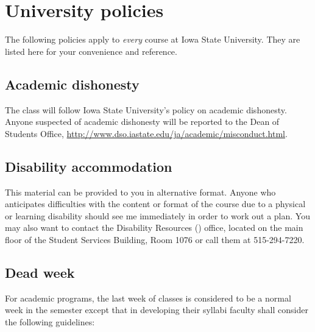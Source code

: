 


\newpage
\section{University policies}

The following policies apply to \emph{every} course at Iowa State
University. They are listed here for your convenience and reference.

\subsection{Academic dishonesty}

The class will follow Iowa State University's policy on academic
dishonesty.  Anyone suspected of academic dishonesty will be reported
to the Dean of Students Office,
\url{http://www.dso.iastate.edu/ja/academic/misconduct.html}.

\subsection{Disability accommodation}

This material can be provided to you in alternative format. Anyone who
anticipates difficulties with the content or format of the course due
to a physical or learning disability should see me immediately in
order to work out a plan. You may also want to contact the Disability
Resources () office, located on the main floor of the
Student Services Building, Room 1076 or call them at 515-294-7220.

\subsection{Dead week}

For academic programs, the last week of classes is considered to be a
normal week in the semester except that in developing their syllabi
faculty shall consider the following guidelines:

